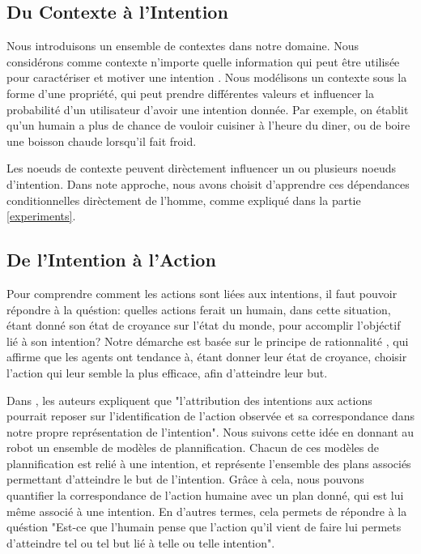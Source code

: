 \documentclass[a4paper,11pt,twoside]{StyleThese}
\begin{document}
\subsection{Du Contexte à l'Intention}
Nous introduisons un ensemble de contextes dans notre domaine. Nous considérons comme contexte n'importe quelle information qui peut être utilisée pour caractériser et motiver une intention \cite{abowd1999towards}. Nous modélisons un contexte sous la forme d'une propriété, qui peut prendre différentes valeurs et influencer la probabilité d'un utilisateur d'avoir une intention donnée. Par exemple, on établit qu'un humain a plus de chance de vouloir cuisiner à l'heure du diner, ou de boire une boisson chaude lorsqu'il fait froid.

Les noeuds de contexte peuvent dirèctement influencer un ou plusieurs noeuds d'intention. Dans note approche, nous avons choisit d'apprendre ces dépendances conditionnelles dirèctement de l'homme, comme expliqué dans la partie \ref{experiments}.

\subsection{De l'Intention à l'Action}
\label{action_evaluation}
Pour comprendre comment les actions sont liées aux intentions, il faut pouvoir répondre à la quéstion: quelles actions ferait un humain, dans cette situation, étant donné son état de croyance sur l'état du monde, pour accomplir l'objéctif lié à son intention? 
Notre démarche est basée sur le principe de rationnalité \cite{Dennet1989}, qui affirme que les agents ont tendance à, étant donner leur état de croyance, choisir l'action qui leur semble la plus efficace, afin d'atteindre leur but.

Dans \cite{Blakemore2001}, les auteurs expliquent que "l'attribution des intentions aux actions pourrait reposer sur l'identification de l'action observée et sa correspondance dans notre propre représentation de l'intention". Nous suivons cette idée en donnant au robot un ensemble de modèles de plannification. Chacun de ces modèles de plannification est relié à une intention, et représente l'ensemble des plans associés permettant d'atteindre le but de l'intention. Grâce à cela, nous pouvons quantifier la correspondance de l'action humaine avec un plan donné, qui est lui même associé à une intention. En d'autres termes, cela permets de répondre à la quéstion "Est-ce que l'humain pense que l'action qu'il vient de faire lui permets d'atteindre tel ou tel but lié à telle ou telle intention".
\end{document}
